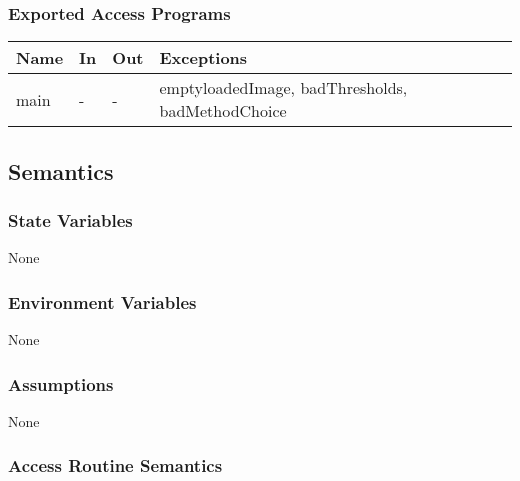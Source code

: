 \documentclass[12pt, titlepage]{article}
\begin{document}
\subsubsection{Exported Access Programs}

\begin{center}
\begin{tabular}{p{2cm} p{2cm} p{2cm} p{6cm}}
\hline
\textbf{Name} & \textbf{In} & \textbf{Out} & \textbf{Exceptions} \\
\hline
main & - & - & emptyloadedImage, badThresholds, badMethodChoice\\
\hline
\end{tabular}
\end{center}

\subsection{Semantics}

\subsubsection{State Variables}

None

\subsubsection{Environment Variables}

None

\subsubsection{Assumptions}

None

\subsubsection{Access Routine Semantics}
\end{document}
